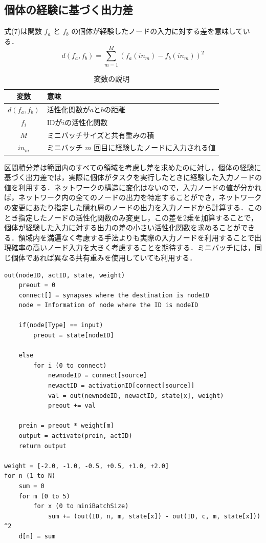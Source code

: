 \subsection{個体の経験に基づく出力差}
式(7)は関数 $ f_a $ と $ f_b $ の個体が経験したノードの入力に対する差を意味している．
\begin{equation}
    d(f_{a}, f_{b}) = \sum_{m=1}^{M}(f_{a}(in_{m}) - f_{b}(in_{m}))^2
\end{equation}

\begin{table}[H]
    \caption{変数の説明}
    \centering
    \begin{tabular}{cl}
        \hline
        変数  & 意味 \\
        \hline \hline
        $d(f_{a}, f_{b})$ & 活性化関数が$a$と$b$の距離                 \\
        $f_{i}$           & IDが$i$の活性化関数                        \\
        $M$               & ミニバッチサイズと共有重みの積             \\
        $in_m$            & ミニバッチ $m$ 回目に経験したノードに入力される値 \\
        \hline
    \end{tabular}
\end{table}

区間積分差は範囲内のすべての領域を考慮し差を求めたのに対し，個体の経験に基づく出力差では，実際に個体がタスクを実行したときに経験した入力ノードの値を利用する．ネットワークの構造に変化はないので，入力ノードの値が分かれば，ネットワーク内の全てのノードの出力を特定することができ，ネットワークの変更にあたり指定した隠れ層のノードの出力を入力ノードから計算する．このとき指定したノードの活性化関数のみ変更し，この差を2乗を加算することで，個体が経験した入力に対する出力の差の小さい活性化関数を求めることができる．領域内を満遍なく考慮する手法よりも実際の入力ノードを利用することで出現確率の高いノード入力を大きく考慮することを期待する．ミニバッチには，同じ個体であれば異なる共有重みを使用していても利用する．

\begin{lstlisting}[caption=経験入力に基づく出力差のプログラム]
out(nodeID, actID, state, weight)
    preout = 0
    connect[] = synapses where the destination is nodeID
    node = Information of node where the ID is nodeID

    if(node[Type] == input)
        preout = state[nodeID]
    
    else
        for i (0 to connect)
            newnodeID = connect[source]
            newactID = activationID[connect[source]]
            val = out(newnodeID, newactID, state[x], weight)
            preout += val
    
    prein = preout * weight[m]
    output = activate(prein, actID)
    return output

weight = [-2.0, -1.0, -0.5, +0.5, +1.0, +2.0]
for n (1 to N)
    sum = 0
    for m (0 to 5)
        for x (0 to miniBatchSize)
            sum += (out(ID, n, m, state[x]) - out(ID, c, m, state[x])) ^2
    d[n] = sum
\end{lstlisting}

